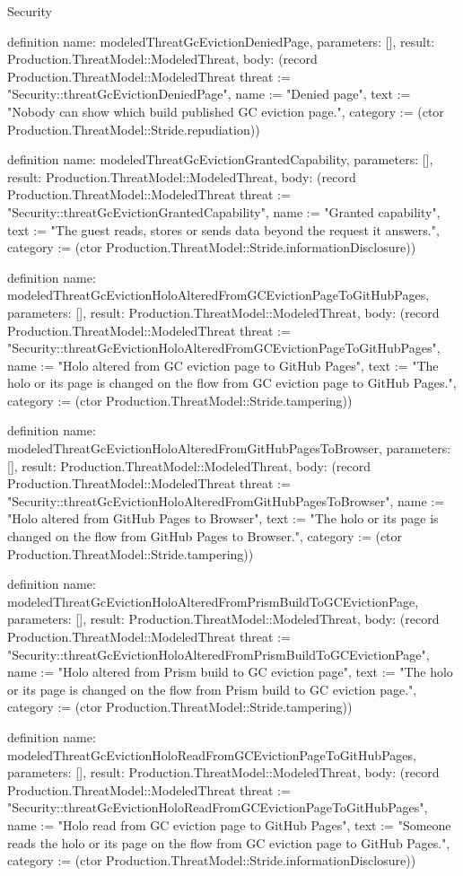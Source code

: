 \begin{lexlean}{Security}
\begin{semanticmodule}
definition{
  name: modeledThreatGcEvictionDeniedPage,
  parameters: [],
  result: Production.ThreatModel::ModeledThreat,
  body: (record Production.ThreatModel::ModeledThreat {threat := "Security::threatGcEvictionDeniedPage", name := "Denied page", text := "Nobody can show which build published GC eviction page.", category := (ctor Production.ThreatModel::Stride.repudiation)})
}

definition{
  name: modeledThreatGcEvictionGrantedCapability,
  parameters: [],
  result: Production.ThreatModel::ModeledThreat,
  body: (record Production.ThreatModel::ModeledThreat {threat := "Security::threatGcEvictionGrantedCapability", name := "Granted capability", text := "The guest reads, stores or sends data beyond the request it answers.", category := (ctor Production.ThreatModel::Stride.informationDisclosure)})
}

definition{
  name: modeledThreatGcEvictionHoloAlteredFromGCEvictionPageToGitHubPages,
  parameters: [],
  result: Production.ThreatModel::ModeledThreat,
  body: (record Production.ThreatModel::ModeledThreat {threat := "Security::threatGcEvictionHoloAlteredFromGCEvictionPageToGitHubPages", name := "Holo altered from GC eviction page to GitHub Pages", text := "The holo or its page is changed on the flow from GC eviction page to GitHub Pages.", category := (ctor Production.ThreatModel::Stride.tampering)})
}

definition{
  name: modeledThreatGcEvictionHoloAlteredFromGitHubPagesToBrowser,
  parameters: [],
  result: Production.ThreatModel::ModeledThreat,
  body: (record Production.ThreatModel::ModeledThreat {threat := "Security::threatGcEvictionHoloAlteredFromGitHubPagesToBrowser", name := "Holo altered from GitHub Pages to Browser", text := "The holo or its page is changed on the flow from GitHub Pages to Browser.", category := (ctor Production.ThreatModel::Stride.tampering)})
}

definition{
  name: modeledThreatGcEvictionHoloAlteredFromPrismBuildToGCEvictionPage,
  parameters: [],
  result: Production.ThreatModel::ModeledThreat,
  body: (record Production.ThreatModel::ModeledThreat {threat := "Security::threatGcEvictionHoloAlteredFromPrismBuildToGCEvictionPage", name := "Holo altered from Prism build to GC eviction page", text := "The holo or its page is changed on the flow from Prism build to GC eviction page.", category := (ctor Production.ThreatModel::Stride.tampering)})
}

definition{
  name: modeledThreatGcEvictionHoloReadFromGCEvictionPageToGitHubPages,
  parameters: [],
  result: Production.ThreatModel::ModeledThreat,
  body: (record Production.ThreatModel::ModeledThreat {threat := "Security::threatGcEvictionHoloReadFromGCEvictionPageToGitHubPages", name := "Holo read from GC eviction page to GitHub Pages", text := "Someone reads the holo or its page on the flow from GC eviction page to GitHub Pages.", category := (ctor Production.ThreatModel::Stride.informationDisclosure)})
}


\end{semanticmodule}
\end{lexlean}
